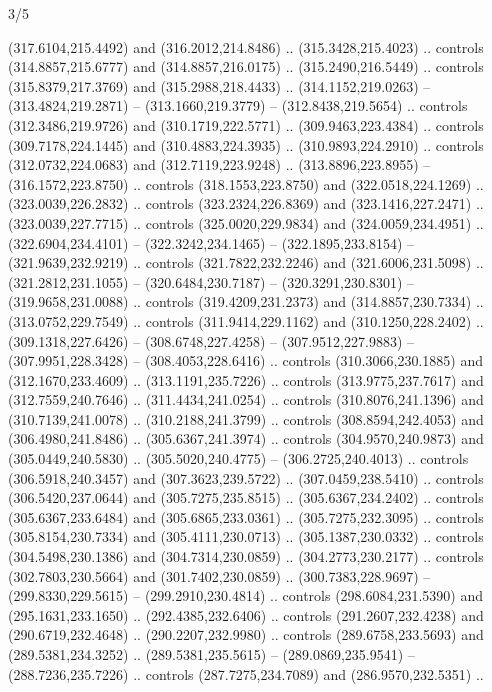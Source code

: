 \begin{flagdescription}{3/5}
\begin{scope}[xshift=0.5\flaglength,yshift=0.5\flagwidth,scale=\flagwidth/270]
\begin{scope}[y=0.8pt, x=0.8pt, yscale=-1,shift={(-281.25,-168.75)}]
  (317.6104,215.4492) and (316.2012,214.8486) .. (315.3428,215.4023) .. controls
  (314.8857,215.6777) and (314.8857,216.0175) .. (315.2490,216.5449) .. controls
  (315.8379,217.3769) and (315.2988,218.4433) .. (314.1152,219.0263) --
  (313.4824,219.2871) -- (313.1660,219.3779) -- (312.8438,219.5654) .. controls
  (312.3486,219.9726) and (310.1719,222.5771) .. (309.9463,223.4384) .. controls
  (309.7178,224.1445) and (310.4883,224.3935) .. (310.9893,224.2910) .. controls
  (312.0732,224.0683) and (312.7119,223.9248) .. (313.8896,223.8955) --
  (316.1572,223.8750) .. controls (318.1553,223.8750) and (322.0518,224.1269) ..
  (323.0039,226.2832) .. controls (323.2324,226.8369) and (323.1416,227.2471) ..
  (323.0039,227.7715) .. controls (325.0020,229.9834) and (324.0059,234.4951) ..
  (322.6904,234.4101) -- (322.3242,234.1465) -- (322.1895,233.8154) --
  (321.9639,232.9219) .. controls (321.7822,232.2246) and (321.6006,231.5098) ..
  (321.2812,231.1055) -- (320.6484,230.7187) -- (320.3291,230.8301) --
  (319.9658,231.0088) .. controls (319.4209,231.2373) and (314.8857,230.7334) ..
  (313.0752,229.7549) .. controls (311.9414,229.1162) and (310.1250,228.2402) ..
  (309.1318,227.6426) -- (308.6748,227.4258) -- (307.9512,227.9883) --
  (307.9951,228.3428) -- (308.4053,228.6416) .. controls (310.3066,230.1885) and
  (312.1670,233.4609) .. (313.1191,235.7226) .. controls (313.9775,237.7617) and
  (312.7559,240.7646) .. (311.4434,241.0254) .. controls (310.8076,241.1396) and
  (310.7139,241.0078) .. (310.2188,241.3799) .. controls (308.8594,242.4053) and
  (306.4980,241.8486) .. (305.6367,241.3974) .. controls (304.9570,240.9873) and
  (305.0449,240.5830) .. (305.5020,240.4775) -- (306.2725,240.4013) .. controls
  (306.5918,240.3457) and (307.3623,239.5722) .. (307.0459,238.5410) .. controls
  (306.5420,237.0644) and (305.7275,235.8515) .. (305.6367,234.2402) .. controls
  (305.6367,233.6484) and (305.6865,233.0361) .. (305.7275,232.3095) .. controls
  (305.8154,230.7334) and (305.4111,230.0713) .. (305.1387,230.0332) .. controls
  (304.5498,230.1386) and (304.7314,230.0859) .. (304.2773,230.2177) .. controls
  (302.7803,230.5664) and (301.7402,230.0859) .. (300.7383,228.9697) --
  (299.8330,229.5615) -- (299.2910,230.4814) .. controls (298.6084,231.5390) and
  (295.1631,233.1650) .. (292.4385,232.6406) .. controls (291.2607,232.4238) and
  (290.6719,232.4648) .. (290.2207,232.9980) .. controls (289.6758,233.5693) and
  (289.5381,234.3252) .. (289.5381,235.5615) -- (289.0869,235.9541) --
  (288.7236,235.7226) .. controls (287.7275,234.7089) and (286.9570,232.5351) ..

\end{scope}
\end{scope}
\end{flagdescription}
